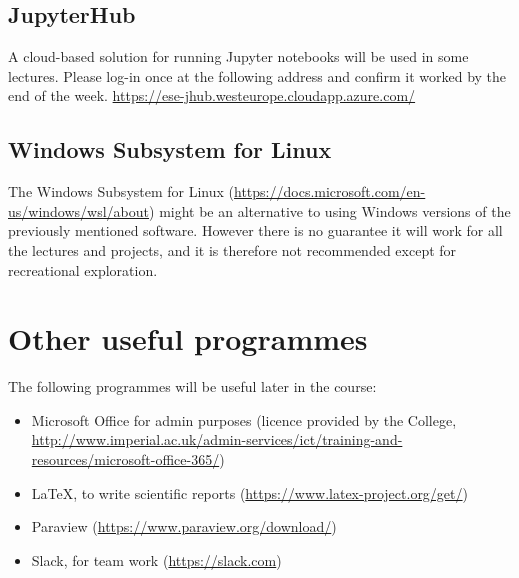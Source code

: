 \documentclass[11pt]{article}
\begin{document}
\subsection{JupyterHub}

A cloud-based solution for running Jupyter notebooks will be used in some lectures. Please log-in once at the following address and confirm it worked by the end of the week.
\url{https://ese-jhub.westeurope.cloudapp.azure.com/}


\subsection{Windows Subsystem for Linux}

The Windows Subsystem for Linux (\url{https://docs.microsoft.com/en-us/windows/wsl/about}) might be an alternative to using Windows versions of the previously mentioned software. 
However there is no guarantee it will work for all the lectures and projects, and it is therefore not recommended except for recreational exploration.


\section{Other useful programmes}

The following programmes will be useful later in the course:
\begin{itemize}
  \item Microsoft Office for admin purposes (licence provided by the College, \url{http://www.imperial.ac.uk/admin-services/ict/training-and-resources/microsoft-office-365/})
  \item LaTeX, to write scientific reports (\url{https://www.latex-project.org/get/})
  \item Paraview (\url{https://www.paraview.org/download/})
  \item Slack, for team work (\url{https://slack.com})
\end{itemize}
\end{document}
